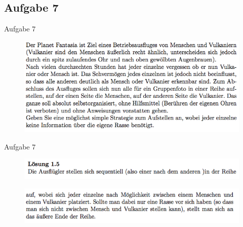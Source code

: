 \subsection{Aufgabe 7}
\begin{frame}{Aufgabe 7}
\begin{figure}[h!]
		\centering
		\includegraphics[width=\textwidth]{../topics/weihnachtstut-aufgaben/18.png} 
	\end{figure}     
\end{frame}

\begin{frame}{Aufgabe 7}
\begin{figure}[h!]
		\centering
		\includegraphics[width=\textwidth]{../topics/weihnachtstut-aufgaben/19.png} 
	\end{figure}  
	\begin{figure}[h!]
		\centering
		\includegraphics[width=\textwidth]{../topics/weihnachtstut-aufgaben/20.png} 
	\end{figure}   
\end{frame}